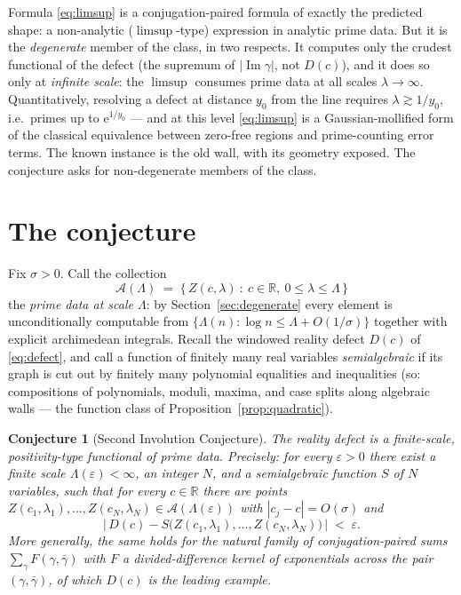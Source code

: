 \documentclass[11pt]{amsart}
\newtheorem{conjecture}[theorem]{Conjecture}
\theoremstyle{definition}
\theoremstyle{remark}
\newcommand{\RR}{\mathbb{R}}
\newcommand{\eE}{\mathrm{e}}
\DeclareMathOperator{\Iim}{Im}
\begin{document}
Formula \eqref{eq:limsup} is a conjugation-paired formula of exactly the predicted shape: a non-analytic ($\limsup$-type) expression in analytic prime data. But it is the \emph{degenerate} member of the class, in two respects. It computes only the crudest functional of the defect (the supremum of $|\!\Iim\gamma|$, not $D(c)$), and it does so only at \emph{infinite scale}: the $\limsup$ consumes prime data at all scales $\lambda\to\infty$. Quantitatively, resolving a defect at distance $y_0$ from the line requires $\lambda\gtrsim1/y_0$, i.e.\ primes up to $\eE^{1/y_0}$ --- and at this level \eqref{eq:limsup} is a Gaussian-mollified form of the classical equivalence between zero-free regions and prime-counting error terms. The known instance is the old wall, with its geometry exposed. The conjecture asks for non-degenerate members of the class.

\section{The conjecture}\label{sec:conj}

Fix $\sigma>0$. Call the collection
\[
\mathcal A(\Lambda)\;=\;\big\{\,Z(c,\lambda)\ :\ c\in\RR,\ 0\le\lambda\le\Lambda\,\big\}
\]
the \emph{prime data at scale $\Lambda$}: by Section~\ref{sec:degenerate} every element is unconditionally computable from $\{\Lambda(n):\log n\le\Lambda+O(1/\sigma)\}$ together with explicit archimedean integrals. Recall the windowed reality defect $D(c)$ of \eqref{eq:defect}, and call a function of finitely many real variables \emph{semialgebraic} if its graph is cut out by finitely many polynomial equalities and inequalities (so: compositions of polynomials, moduli, maxima, and case splits along algebraic walls --- the function class of Proposition~\ref{prop:quadratic}).

\begin{conjecture}[Second Involution Conjecture]\label{conj:main}
The reality defect is a finite-scale, positivity-type functional of prime data. Precisely: for every $\varepsilon>0$ there exist a finite scale $\Lambda(\varepsilon)<\infty$, an integer $N$, and a semialgebraic function $S$ of $N$ variables, such that for every $c\in\RR$ there are points $Z(c_1,\lambda_1),\dots,Z(c_N,\lambda_N)\in\mathcal A(\Lambda(\varepsilon))$ with $|c_j-c|=O(\sigma)$ and
\[
\big|\,D(c)-S\big(Z(c_1,\lambda_1),\dots,Z(c_N,\lambda_N)\big)\,\big|\;<\;\varepsilon .
\]
More generally, the same holds for the natural family of conjugation-paired sums $\sum_\gamma F(\gamma,\bar\gamma)$ with $F$ a divided-difference kernel of exponentials across the pair $(\gamma,\bar\gamma)$, of which $D(c)$ is the leading example.
\end{conjecture}
\end{document}
